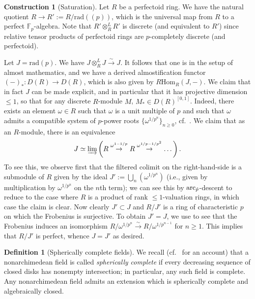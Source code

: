 \documentclass{amsart}
\renewcommand{\hom}{\mathrm{Hom}}
\theoremstyle{definition}
\newtheorem{construction}[theorem]{Construction}
\newtheorem{definition}[theorem]{Definition}
\begin{document}
\begin{construction}[Saturation] 
Let $R$ be a perfectoid ring. We have the natural quotient $R \to
R' := R/\mathrm{rad}((p))$, which is the universal map from $R$ to a perfect
$\mathbb{F}_p$-algebra. 
Note that $R' \otimes^L_R R' $ is discrete (and equivalent to $R'$) since
relative tensor products of perfectoid rings are $p$-completely discrete (and
perfectoid).

Let $J = \mathrm{rad}(p)$. 
We have $J \otimes^L_R J \xrightarrow{\sim} J$. 
It follows that one is in the setup of almost mathematics, 
and we have a derived almostification functor $(-)_* \colon D(R) \to D(R)$,
which is also given by $R \hom_R( J, -)$. 
We claim that in fact $J$ can be made explicit, and in particular that it has
projective dimension $\leq 1$, so that for any discrete $R$-module $M$, $M_* \in D(R)^{[0, 1]}$. 
Indeed, there exists an element $\omega \in R$ such that 
$\omega$ is a unit multiple of $p$
and such
that $\omega$ admits a compatible system of $p$-power roots $\{\omega^{1/p^n}\}_{n
\geq 0}$, cf.~\cite[Lem.~3.9]{BMS1}. We claim that as an $R$-module, there is an
equivalence
\begin{equation}  J \simeq \varinjlim \left( R \stackrel{\omega^{1-1/p}}{\to} R
\stackrel{\omega^{1/p -
1/p^2}}{\to} \dots \right).  \end{equation}
To see this, 
we observe first that the filtered colimit on the right-hand-side is a submodule
of 
$R$
given by the ideal $J' := \bigcup_{n} (\omega^{1/p^n})$ (i.e., given by multiplication
by $\omega^{1/p^n}$ on the $n$th term); we can see this by $\mathrm{arc}_{\hat{p}}$-descent to reduce to the case where 
$R$ is a product of rank $\leq 1$-valuation rings, in which case the claim is
clear. Now clearly $J' \subset J$ and 
$R/ J'$ is a ring of characteristic $p$ on which the Frobenius
is surjective.  To obtain $J' = J$, 
we use \cite[Lem.~3.10]{BMS1} to see that the Frobenius induces an isomorphism
$R/\omega^{1/p^n} \xrightarrow{\sim} R/\omega^{1/p^{n-1}}$ for $n \geq 1$. 
This implies that $R/J'$ is perfect, whence $J = J'$ as desired. 
\end{construction} 

\begin{definition}[Spherically complete fields] 
We recall (cf.~\cite[Ch.~4]{vanRooij78} for an account) that a nonarchimedean field is called \emph{spherically complete} if
every decreasing sequence of closed disks 
has nonempty intersection; in particular, any such field is complete. Any
nonarchimedean field admits an extension which is spherically complete and
algebraically closed.  
\end{definition} 
\end{document}
